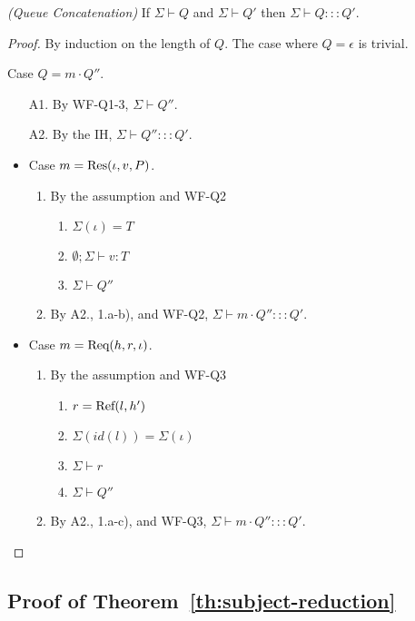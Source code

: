 \begin{lemmaun}
\emph{(Queue Concatenation)}
If $\Sigma \vdash Q$ and $\Sigma \vdash Q'$ then $\Sigma \vdash Q ::: Q'$.
\end{lemmaun}
\begin{proof}
By induction on the length of $Q$. The case where $Q = \epsilon$ is trivial.

Case $Q = m \cdot Q''$.
\begin{enumerate}
\item[A1.] By \textsc{WF-Q1-3}, $\Sigma \vdash Q''$.
\item[A2.] By the IH, $\Sigma \vdash Q'' ::: Q'$.
\end{enumerate}

\begin{itemize}
\item Case $m = {\textrm{Res}(\iota, v, P)}$.
\begin{enumerate}
\item By the assumption and \textsc{WF-Q2}
  \begin{enumerate}[label=(\alph*)]
  \item $\Sigma(\iota) = T$
  \item $\emptyset ; \Sigma \vdash v : T$
  \item $\Sigma \vdash Q''$
  \end{enumerate}
\item By A2., 1.a-b), and \textsc{WF-Q2}, $\Sigma \vdash m \cdot Q'' ::: Q'$.
\end{enumerate}

\item Case $m = {\textrm{Req}(h, r, \iota)}$.
\begin{enumerate}
\item By the assumption and \textsc{WF-Q3}
  \begin{enumerate}[label=(\alph*)]
  \item $r = {\textrm{Ref}(l, h')}$
  \item $\Sigma(id(l)) = \Sigma(\iota)$
  \item $\Sigma \vdash r$
  \item $\Sigma \vdash Q''$
  \end{enumerate}
\item By A2., 1.a-c), and \textsc{WF-Q3}, $\Sigma \vdash m \cdot Q'' ::: Q'$.
\end{enumerate}
\end{itemize}
\end{proof}


\subsection{Proof of Theorem~\ref{th:subject-reduction}}\label{app:subject-reduction}

